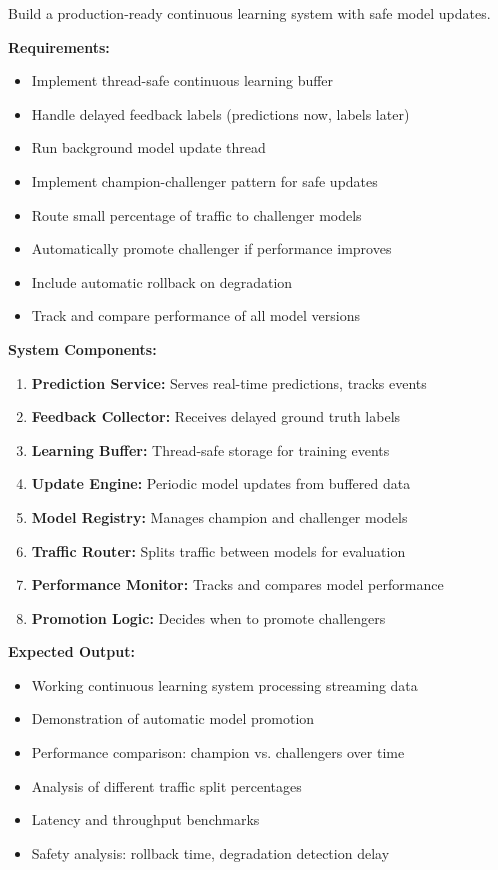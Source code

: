 Build a production-ready continuous learning system with safe model updates.

\textbf{Requirements:}
\begin{itemize}
    \item Implement thread-safe continuous learning buffer
    \item Handle delayed feedback labels (predictions now, labels later)
    \item Run background model update thread
    \item Implement champion-challenger pattern for safe updates
    \item Route small percentage of traffic to challenger models
    \item Automatically promote challenger if performance improves
    \item Include automatic rollback on degradation
    \item Track and compare performance of all model versions
\end{itemize}

\textbf{System Components:}
\begin{enumerate}
    \item \textbf{Prediction Service:} Serves real-time predictions, tracks events
    \item \textbf{Feedback Collector:} Receives delayed ground truth labels
    \item \textbf{Learning Buffer:} Thread-safe storage for training events
    \item \textbf{Update Engine:} Periodic model updates from buffered data
    \item \textbf{Model Registry:} Manages champion and challenger models
    \item \textbf{Traffic Router:} Splits traffic between models for evaluation
    \item \textbf{Performance Monitor:} Tracks and compares model performance
    \item \textbf{Promotion Logic:} Decides when to promote challengers
\end{enumerate}

\textbf{Expected Output:}
\begin{itemize}
    \item Working continuous learning system processing streaming data
    \item Demonstration of automatic model promotion
    \item Performance comparison: champion vs. challengers over time
    \item Analysis of different traffic split percentages
    \item Latency and throughput benchmarks
    \item Safety analysis: rollback time, degradation detection delay
\end{itemize}

